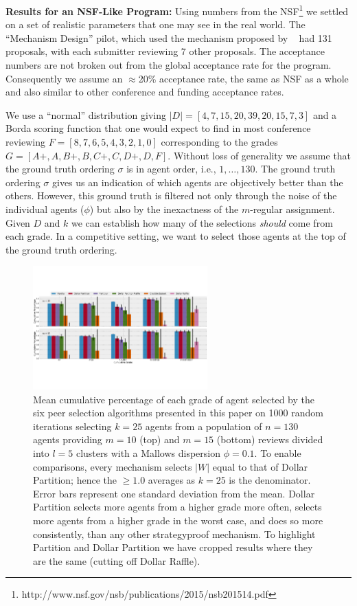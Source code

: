 \documentclass[letterpaper]{article}
\newcommand{\citet}[1]{\citeauthor{#1}~\shortcite{#1}}
\begin{document}
\smallskip
\noindent
\textbf{Results for an NSF-Like Program:}
Using numbers from the NSF\footnote{http://www.nsf.gov/nsb/publications/2015/nsb201514.pdf} we settled on a set of realistic parameters that one may see in the real world. The ``Mechanism Design'' pilot, which used the mechanism proposed by \citet{MeSa09a} had 131 proposals, with each submitter reviewing 7 other proposals.
The acceptance numbers are not broken out from the global acceptance rate for the program. Consequently we assume an $\approx$20\% acceptance rate, the same as NSF as a whole and also similar to other conference and funding acceptance rates.

We use a ``normal'' distribution %
giving $|D| = [4, 7, 15, 20, 39, 20, 15, 7, 3]$
and a Borda scoring function that one would expect to find in most conference reviewing
$F = [8, 7, 6, 5, 4, 3, 2, 1, 0]$ corresponding to the grades $G = [A+, A, B+, B, C+, C, D+, D, F]$. Without loss of generality we assume that the ground truth ordering $\sigma$ is in agent order, i.e., $1, \ldots, 130$.
The ground truth ordering $\sigma$ gives us an indication of which agents are objectively better
than the others. However, this ground truth is filtered not only through the noise of the individual
agents ($\phi$) but also by the inexactness of the $m$-regular assignment. Given $D$ and $k$ we can
establish how many of the selections \emph{should} come from each grade.
In a competitive setting, we want to select those agents at the top of the ground truth ordering.

\begin{figure}
\centering
\includegraphics[width=.8\textwidth,height=1.8720000000000003in ]{./cumulative_grade_big-emb}
\caption{Mean cumulative percentage of each grade of agent selected by the six peer selection algorithms presented in this paper on 1000 random iterations selecting $k=25$ agents from a population of $n=130$ agents providing $m=10$ (top) and $m=15$ (bottom) reviews divided into $l=5$ clusters with a Mallows dispersion $\phi = 0.1$. To enable comparisons, every mechanism selects $|W|$ equal to that of Dollar Partition; hence the $\geq 1.0$ averages as $k=25$ is the denominator.
Error bars represent one standard deviation from the mean.
Dollar Partition selects more agents from a higher grade more often, selects more agents from a higher grade in the worst case, and does so more consistently, than any other strategyproof mechanism. To highlight Partition and Dollar Partition we have cropped results where they are the same (cutting off Dollar Raffle).}\label{fig:results}
\end{figure}
\end{document}
